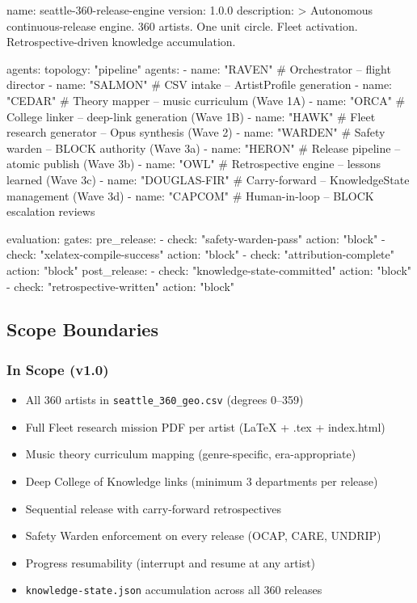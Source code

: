 \documentclass[11pt,letterpaper]{article}
\begin{document}
\begin{asciibox}
name: seattle-360-release-engine
version: 1.0.0
description: >
  Autonomous continuous-release engine. 360 artists. One unit circle.
  Fleet activation. Retrospective-driven knowledge accumulation.

agents:
  topology: "pipeline"
  agents:
    - name: "RAVEN"         # Orchestrator -- flight director
    - name: "SALMON"        # CSV intake -- ArtistProfile generation
    - name: "CEDAR"         # Theory mapper -- music curriculum (Wave 1A)
    - name: "ORCA"          # College linker -- deep-link generation (Wave 1B)
    - name: "HAWK"          # Fleet research generator -- Opus synthesis (Wave 2)
    - name: "WARDEN"        # Safety warden -- BLOCK authority (Wave 3a)
    - name: "HERON"         # Release pipeline -- atomic publish (Wave 3b)
    - name: "OWL"           # Retrospective engine -- lessons learned (Wave 3c)
    - name: "DOUGLAS-FIR"   # Carry-forward -- KnowledgeState management (Wave 3d)
    - name: "CAPCOM"        # Human-in-loop -- BLOCK escalation reviews

evaluation:
  gates:
    pre_release:
      - check: "safety-warden-pass"
        action: "block"
      - check: "xelatex-compile-success"
        action: "block"
      - check: "attribution-complete"
        action: "block"
    post_release:
      - check: "knowledge-state-committed"
        action: "block"
      - check: "retrospective-written"
        action: "block"
\end{asciibox}

\subsection{Scope Boundaries}

\subsubsection{In Scope (v1.0)}
\begin{itemize}[leftmargin=2em]
  \item All 360 artists in \texttt{seattle\_360\_geo.csv} (degrees 0--359)
  \item Full Fleet research mission PDF per artist (LaTeX + .tex + index.html)
  \item Music theory curriculum mapping (genre-specific, era-appropriate)
  \item Deep College of Knowledge links (minimum 3 departments per release)
  \item Sequential release with carry-forward retrospectives
  \item Safety Warden enforcement on every release (OCAP\textregistered{}, CARE, UNDRIP)
  \item Progress resumability (interrupt and resume at any artist)
  \item \texttt{knowledge-state.json} accumulation across all 360 releases
\end{itemize}
\end{document}
